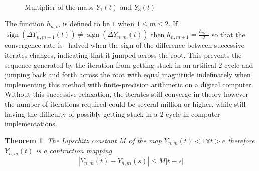 \documentclass{elsarticle}
\newcommand{\tmop}[1]{\ensuremath{\operatorname{#1}}}
\newtheorem{theorem}{Theorem}
\begin{document}
\

\begin{figure}[h]
  \caption{Multiplier of the maps $Y_1 (t)$ and $Y_3 (t)$}
\end{figure}

\begin{remark}
  The function $h_{n, m}$ is defined to be $1$ when $1 \leqslant m \leqslant
  2$. If $\tmop{sign} (\Delta Y^{}_{n, m - 1} (t)) \neq \tmop{sign} (\Delta
  Y^{}_{n, m} (t))$ then $h_{n, m + 1} = \frac{h_{n, m}}{2}$ so that the
  convergence rate is \ halved when the sign of the difference between
  successive iterates changes, indicating that it jumped across the root. This
  prevents the sequence generated by the iteration from getting stuck in an
  artifical $2$-cycle and jumping back and forth across the root with equal
  magnitude indefinately when implementing this method with finite-precision
  arithmetic on a digital computer. Without this successive relaxation, the
  iterates still converge in theory however the number of iterations required
  could be several million or higher, while still having the difficulty of
  possibly getting stuck in a $2$-cycle in computer implementations.
\end{remark}

\begin{theorem}
  \label{cm}The Lipschitz constant $M$ of the map $Y_{n, m} (t) < 1 \forall t
  > e$ therefore $Y_{n, m} (t)$ is a contraction mapping
  \begin{equation}
    | Y_{n, m} (t) - Y_{n, m} (s) | \leqslant M | t - s |
  \end{equation}
\end{theorem}
\end{document}
